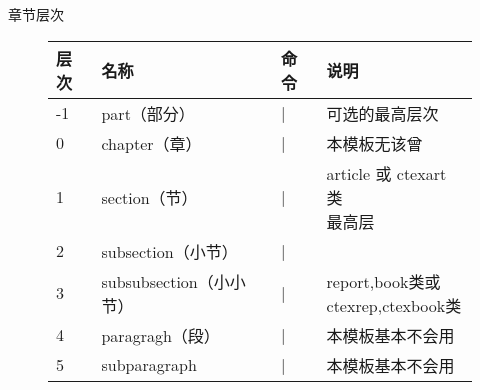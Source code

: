 \begin{frame}[fragile]{章节层次}
	\begin{figure}
		\centering
		\label{tab:leavel}
		\begin{tabular}{llll}
			\toprule
			层次	&	名称	&	命令	&	说明	\\
			\midrule	
			-1	&	part（部分）	&	|\part|		&	可选的最高层次		\\
			0	&	chapter（章）	&	|\chapter|	&	本模板无该曾	\\
			1	&	section（节）	&	|\section|	  &	  \makecell[l]{ article 或 ctexart 类\\最高层}	\\
			2 	&	subsection（小节）	&	|\subsection|	&						\\
			3	&	subsubsection（小小节）			&	|\subsubsection|	& \makecell[l]{report,book类或\\ 
				ctexrep,ctexbook类}		\\
			4	&  	paragragh（段）		&  |\paragraph|						&	本模板基本不会用\\
			5	&	subparagraph			&	|\subparagraph|				&	本模板基本不会用\\
			\bottomrule
			
		\end{tabular}
	\end{figure}
\end{frame}
	
